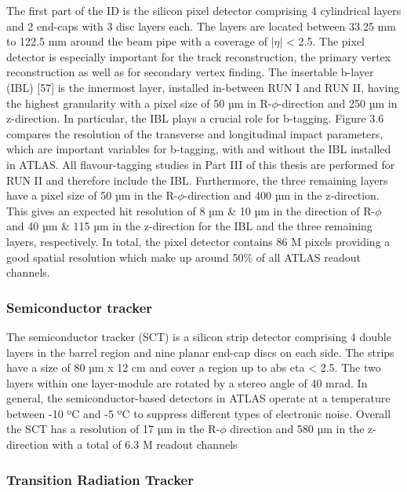 The first part of the ID is the silicon pixel detector comprising 4 cylindrical layers and 2 end-caps with 3 disc layers each. The layers are located between 33.25 mm to 122.5 mm around the beam pipe with a coverage of $|\eta|$ < 2.5. The pixel detector is especially important for the track reconstruction, the primary vertex reconstruction as well as for secondary vertex finding. The insertable b-layer (IBL) [57] is the innermost layer, installed in-between RUN I and RUN II, having the highest granularity with a pixel size of 50 µm in R-$\phi$-direction and 250 µm in z-direction.
In particular, the IBL plays a crucial role for b-tagging. Figure 3.6 compares the resolution of the transverse and longitudinal impact parameters, which are important variables for b-tagging, with and without the IBL installed in ATLAS. All flavour-tagging studies in Part III of this thesis are performed for RUN II and therefore include the IBL.
Furthermore, the three remaining layers have a pixel size of 50 µm in the R-$\phi$-direction and 400 µm in the z-direction. This gives an expected hit resolution of 8 µm \& 10 µm in the direction of R-$\phi$ and 40 µm \& 115 µm in the z-direction for the IBL and the three remaining layers, respectively. In total, the pixel detector contains 86 M pixels providing a good spatial resolution which make up
around 50\% of all ATLAS readout channels.


\subsubsection*{Semiconductor tracker}

The semiconductor tracker (SCT) is a silicon strip detector comprising 4 double layers in the barrel region and nine planar end-cap discs on each side. The strips have a size of 80 µm x 12 cm and cover a region up to abs eta < 2.5. The two layers within one layer-module are rotated by a stereo angle of 40 mrad. In general, the semiconductor-based detectors in ATLAS operate at a temperature between -10 ºC and -5 ºC to suppress different types of electronic noise. Overall the SCT has a resolution of 17 µm in the R-$\phi$ direction and 580 µm in the z-direction with a total of 6.3 M readout channels


\subsubsection*{Transition Radiation Tracker}

